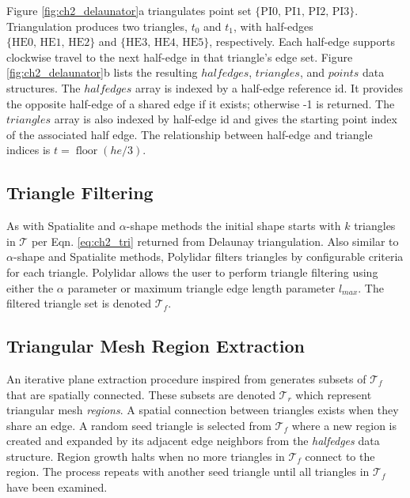 Figure \ref{fig:ch2_delaunator}a triangulates point set $\{\text{PI0, PI1, PI2, PI3}\}$.  Triangulation produces two triangles, $t_0$ and $t_1$, with half-edges $\{\text{HE0, HE1, HE2}\}$ and $\{\text{HE3, HE4, HE5} \}$, respectively.  Each half-edge supports clockwise travel to the next half-edge in that triangle's edge set. Figure \ref{fig:ch2_delaunator}b lists the resulting $halfedges$, $triangles$, and $points$ data structures.  The $halfedges$ array is indexed by a half-edge reference id. It provides the opposite half-edge of a shared edge if it exists; otherwise -1 is returned. The $triangles$ array is also indexed by half-edge id and gives the starting point index of the associated half edge. The relationship between half-edge and triangle indices is $t = \operatorname{floor}(he / 3)$.

\subsection{Triangle Filtering}\label{sec:ch2_triangle_filtering_2d}
As with Spatialite and $\alpha$-shape methods the initial shape starts with $k$ triangles in $\mathcal{T}$ per Eqn. \ref{eq:ch2_tri} returned from Delaunay triangulation. Also similar to $\alpha$-shape and Spatialite methods, Polylidar filters triangles by configurable criteria for each triangle. Polylidar allows the user to perform triangle filtering using either the $\alpha$ parameter or maximum triangle edge length parameter $l_{max}$. The filtered triangle set is denoted $\mathcal{T}_f$. 



\subsection{Triangular Mesh Region Extraction}\label{sec:ch2_mesh_extraction}

An iterative plane extraction procedure inspired from \cite{cao_roof_2017} generates subsets of $\mathcal{T}_f$ that are spatially connected.  These subsets are denoted  $\mathcal{T}_r$ which represent triangular mesh \emph{regions}. A spatial connection between triangles exists when they share an edge. A random seed triangle is selected from $\mathcal{T}_f$ where a new region is created and expanded by its adjacent edge neighbors from the \emph{halfedges} data structure. Region growth halts when no more triangles in $\mathcal{T}_f$ connect to the region. The process repeats with another seed triangle until all triangles in $\mathcal{T}_f$ have been examined. 


